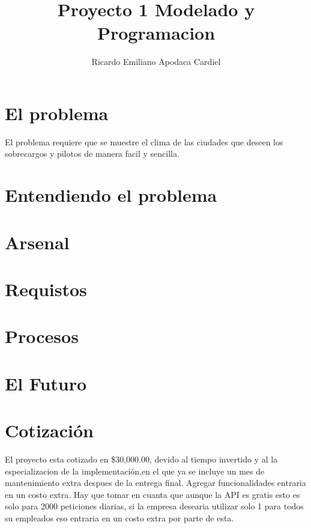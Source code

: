 \documentclass{article}
\title{Proyecto 1 Modelado y Programacion}
\author{Ricardo Emiliano Apodaca Cardiel}
\date{}
\begin{document}
    \maketitle
    \tableofcontents


    \newpage

    \section{El problema}

    El problema requiere que se muestre el clima de las ciudades que deseen los sobrecargos y pilotos de manera facil y sencilla.


    \section{Entendiendo el problema}
    \label{sec:EntProb}
    

    \section{Arsenal}
    \label{sec:Arsenal}
    
    \newpage

    \section{Requistos}
    \label{sec:Requisitos}
    
    \newpage


    \section{Procesos}
    \label{sec:Procesos}
    

    \section{El Futuro}
    


   \section{Cotización}
   El proyecto esta cotizado en \$30,000.00, devido al tiempo invertido y al la especializacion de la implementación,en 
   el que ya se incluye un mes de mantenimiento extra despues de la entrega final.
   Agregar funcionalidades entraria en un costo extra. Hay que tomar en cuanta que aunque la API es gratis
   esto es solo para 2000 peticiones diarias, si la empresa desearia utilizar solo 1 para todos su empleados eso entraria
   en un costo extra por parte de esta.
\end{document}
